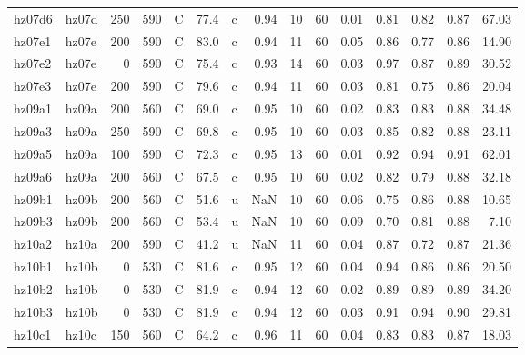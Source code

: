 \documentclass{article}
\begin{document}
\begin{landscape}
\begin{longtable}{llrrlrlrrrrrrrr}
      hz07d6 &      hz07d &  250 &  590 &     C &    77.4 &   c &  0.94 &  10 &         60 &  0.01 &  0.81 &  0.82 &  0.87 &   67.03 \\
      hz07e1 &      hz07e &  200 &  590 &     C &    83.0 &   c &  0.94 &  11 &         60 &  0.05 &  0.86 &  0.77 &  0.86 &   14.90 \\
      hz07e2 &      hz07e &    0 &  590 &     C &    75.4 &   c &  0.93 &  14 &         60 &  0.03 &  0.97 &  0.87 &  0.89 &   30.52 \\
      hz07e3 &      hz07e &  200 &  590 &     C &    79.6 &   c &  0.94 &  11 &         60 &  0.03 &  0.81 &  0.75 &  0.86 &   20.04 \\
      hz09a1 &      hz09a &  200 &  560 &     C &    69.0 &   c &  0.95 &  10 &         60 &  0.02 &  0.83 &  0.83 &  0.88 &   34.48 \\
      hz09a3 &      hz09a &  250 &  590 &     C &    69.8 &   c &  0.95 &  10 &         60 &  0.03 &  0.85 &  0.82 &  0.88 &   23.11 \\
      hz09a5 &      hz09a &  100 &  590 &     C &    72.3 &   c &  0.95 &  13 &         60 &  0.01 &  0.92 &  0.94 &  0.91 &   62.01 \\
      hz09a6 &      hz09a &  200 &  560 &     C &    67.5 &   c &  0.95 &  10 &         60 &  0.02 &  0.82 &  0.79 &  0.88 &   32.18 \\
      hz09b1 &      hz09b &  200 &  560 &     C &    51.6 &   u &   NaN &  10 &         60 &  0.06 &  0.75 &  0.86 &  0.88 &   10.65 \\
      hz09b3 &      hz09b &  200 &  560 &     C &    53.4 &   u &   NaN &  10 &         60 &  0.09 &  0.70 &  0.81 &  0.88 &    7.10 \\
      hz10a2 &      hz10a &  200 &  590 &     C &    41.2 &   u &   NaN &  11 &         60 &  0.04 &  0.87 &  0.72 &  0.87 &   21.36 \\
      hz10b1 &      hz10b &    0 &  530 &     C &    81.6 &   c &  0.95 &  12 &         60 &  0.04 &  0.94 &  0.86 &  0.86 &   20.50 \\
      hz10b2 &      hz10b &    0 &  530 &     C &    81.9 &   c &  0.94 &  12 &         60 &  0.02 &  0.89 &  0.89 &  0.89 &   34.20 \\
      hz10b3 &      hz10b &    0 &  530 &     C &    81.9 &   c &  0.94 &  12 &         60 &  0.03 &  0.91 &  0.94 &  0.90 &   29.81 \\
      hz10c1 &      hz10c &  150 &  560 &     C &    64.2 &   c &  0.96 &  11 &         60 &  0.04 &  0.83 &  0.83 &  0.87 &   18.03 \\

\end{longtable}
\end{landscape}
\end{document}
